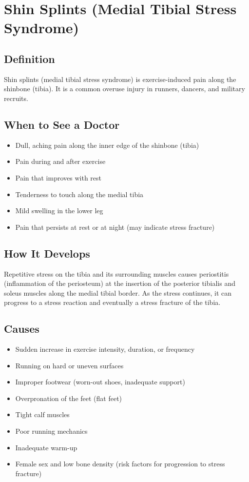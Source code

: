 \chapter{Shin Splints (Medial Tibial Stress Syndrome)}

\section*{Definition}
Shin splints (medial tibial stress syndrome) is exercise-induced pain along the shinbone (tibia). It is a common overuse injury in runners, dancers, and military recruits.

\section*{When to See a Doctor}
\begin{itemize}
\item Dull, aching pain along the inner edge of the shinbone (tibia)
\item Pain during and after exercise
\item Pain that improves with rest
\item Tenderness to touch along the medial tibia
\item Mild swelling in the lower leg
\item Pain that persists at rest or at night (may indicate stress fracture)
\end{itemize}

\section*{How It Develops}
Repetitive stress on the tibia and its surrounding muscles causes periostitis (inflammation of the periosteum) at the insertion of the posterior tibialis and soleus muscles along the medial tibial border. As the stress continues, it can progress to a stress reaction and eventually a stress fracture of the tibia.

\section*{Causes}
\begin{itemize}
\item Sudden increase in exercise intensity, duration, or frequency
\item Running on hard or uneven surfaces
\item Improper footwear (worn-out shoes, inadequate support)
\item Overpronation of the feet (flat feet)
\item Tight calf muscles
\item Poor running mechanics
\item Inadequate warm-up
\item Female sex and low bone density (risk factors for progression to stress fracture)
\end{itemize}

